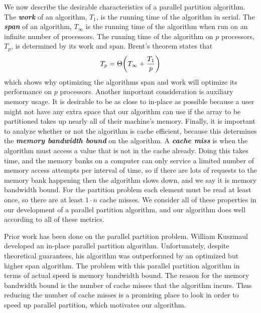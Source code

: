 \documentclass[twocolumn, twoside, 12pt]{article}
\DeclarePairedDelimiter{\paren}{(}{)}
\newcommand{\defn}[1]       {{\textit{\textbf{\boldmath #1}}}}
\renewcommand{\paragraph}[1]{\vspace{0.09in}\noindent{\bf \boldmath #1.}}
\begin{document}
\paragraph{Factors to Consider}
We now describe the desirable characteristics of a parallel partition algorithm.
The \defn{work} of an algorithm, $T_1$, is the running time of the algorithm in serial. 
The \defn{span} of an algorithm, $T_\infty$ is the running time of the algorithm when run on an infinite number of processors.
The running time of the algorithm on $p$ processors, $T_p$, is determined by its work and span.
Brent's theorem states that $$T_p = \Theta \paren*{T_\infty + \frac{T_1}{p}}$$ which shows why optimizing the algorithms span and work will optimize its performance on $p$ processors.
Another important consideration is auxiliary memory usage. It is desirable to be as close to in-place as possible because a user might not have any extra space that our algorithm can use if the array to be partitioned takes up nearly all of their machine's memory.
Finally, it is important to analyze whether or not the algorithm is cache efficient, because this determines the \defn{memory bandwidth bound} on the algorithm.
A \defn{cache miss} is when the algorithm must access a value that is not in the cache already.
Doing this takes time, and the memory banks on a computer can only service a limited number of memory access attempts per interval of time, so if there are lots of requests to the memory bank happening then the algorithm slows down, and we say it is memory bandwidth bound.
For the partition problem each element must be read at least once, so there are at least $1\cdot n$ cache misses.
We consider all of these properties in our development of a parallel partition algorithm, and our algorithm does well according to all of these metrics.

\paragraph{Prior Work}
Prior work has been done on the parallel partition problem.
William Kuszmaul developed an in-place parallel partition algorithm.
Unfortunately, despite theoretical guarantees, his algorithm was outperformed by an optimized but higher span algorithm.
The problem with this parallel partition algorithm in terms of actual speed is memory bandwidth bound.
The reason for the memory bandwidth bound is the number of cache misses that the algorithm incurs.
Thus reducing the number of cache misses is a promising place to look in order to speed up parallel partition, which motivates our algorithm.
\end{document}
